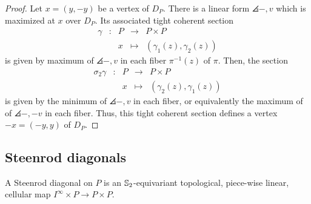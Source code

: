 \begin{proof}
	Let $x = (y,-y)$ be a vertex of $D_P$.
	There is a linear form $\angles{-,v}$ which is maximized at $x$ over $D_P$.
	Its associated tight coherent section
	\begin{equation*}
		\begin{matrix}
			\gamma & : & P & \to & P \times P \\
			& & x  & \mapsto & (\gamma_1(z),\gamma_2(z))
		\end{matrix}
	\end{equation*}
	is given by maximum of $\angles{-,v}$ in each fiber $\pi^{-1}(z)$ of $\pi$.
	Then, the section
	\begin{equation*}
		\begin{matrix}
			\sigma_2\gamma & : & P & \to & P \times P \\
			& & x  & \mapsto & (\gamma_2(z),\gamma_1(z))
		\end{matrix}
	\end{equation*}
	is given by the minimum of $\angles{-,v}$ in each fiber, or equivalently the maximum of of $\angles{-,-v}$ in each fiber.
	Thus, this tight coherent section defines a vertex $-x=(-y,y)$ of $D_P$.
\end{proof}


\subsection{Steenrod diagonals}

%


\begin{definition}
	A Steenrod diagonal on $P$ is an $\mathbb{S}_2$-equivariant topological, piece-wise linear, cellular map $I^\infty \times P \to P \times P$.
\end{definition}


